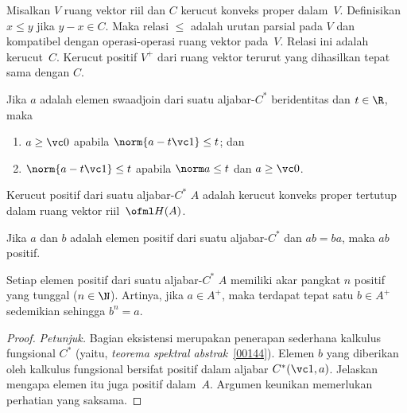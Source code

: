 \begin{prop}\label{0018008} Misalkan $V$ ruang vektor riil dan $C$ kerucut konveks proper
dalam~$V$. Definisikan $x \le y$ jika $y - x \in C$. Maka relasi $\le$ adalah urutan parsial
pada $V$ dan kompatibel dengan operasi-operasi ruang vektor pada~$V$. Relasi ini adalah
 kerucut~$C$. Kerucut positif $V^+$ dari ruang vektor terurut yang dihasilkan
tepat sama dengan $C$.
\end{prop}

\begin{prop} Jika $a$ adalah elemen swaadjoin dari suatu aljabar-$C^*$ beridentitas dan $t \in \R$, maka
 \begin{enumerate}
   \item[(i)] $a \ge \vc 0$ apabila $\norm{a - t\vc 1} \le t$; dan
   \item[(ii)] $\norm{a - t\vc 1} \le t$ apabila $\norm a \le t$ dan $a \ge \vc 0$.
  \end{enumerate}
\end{prop}

\begin{exam} Kerucut positif dari suatu aljabar-$C^*$ $A$ adalah kerucut konveks proper tertutup
dalam ruang vektor riil~$\ofml H(A)$.
\end{exam}

\begin{prop}\label{0018015} Jika $a$ dan $b$ adalah elemen positif dari suatu aljabar-$C^*$
dan $ab = ba$, maka $ab$ positif.
\end{prop}

\begin{prop}\label{001804} Setiap elemen positif dari suatu aljabar-$C^*$ $A$ memiliki akar pangkat
$n$ positif yang tunggal ($n \in \N$). Artinya, jika $a \in A^+$, maka terdapat tepat satu
$b \in A^+$ sedemikian sehingga $b^n = a$.
\end{prop}

\begin{proof} \emph{Petunjuk.} Bagian eksistensi merupakan penerapan sederhana kalkulus fungsional
$C^*$ (yaitu, \emph{teorema spektral abstrak}~\ref{00144}). Elemen $b$
yang diberikan oleh kalkulus fungsional bersifat positif dalam aljabar $C^*(\vc 1,a)$. Jelaskan mengapa
elemen itu juga positif dalam~$A$. Argumen keunikan memerlukan perhatian yang saksama. \ns
\end{proof}

